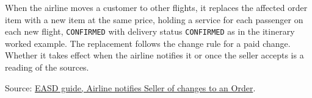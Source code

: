 \begin{definition}
  \label{def:airline-change-reaccommodation}
  When the airline moves a customer to other flights, it replaces the
  affected order item with a new item at the same price, holding a service
  for each passenger on each new flight, \texttt{CONFIRMED} with delivery
  status \texttt{CONFIRMED} as in the itinerary worked example.  The
  replacement follows the change rule for a paid change.  Whether it takes
  effect when the airline notifies it or once the seller accepts is a
  reading of the sources.

  Source: \href{https://standards.atlassian.net/wiki/spaces/EASD/pages/815202352}{EASD guide, Airline notifies Seller of changes to an Order}.
\end{definition}

